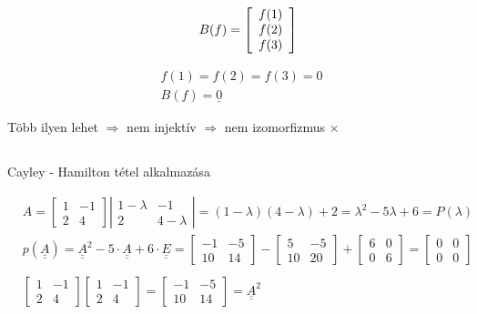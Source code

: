 $$
\begin{aligned}
&\end{aligned} \quad B(f)=\left[\begin{array}{l}
f(1) \\
f(2) \\
f(3)
\end{array}\right] \\
$$

$$
\begin{aligned}
& f(1)=f(2)=f(3)=0 \\
& B(f)=\underline{0}
\end{aligned}
$$

Több ilyen lehet $\Rightarrow$ nem injektív $\Rightarrow$ nem izomorfizmus $\times$

\subsection{}
Cayley - Hamilton tétel alkalmazása

$$
\begin{aligned}
&A=\left[\begin{array}{cc}
1 & -1 \\
2 & 4
\end{array}\right]\left|\begin{array}{cc}
1-\lambda & -1 \\
2 & 4-\lambda
\end{array}\right|=(1-\lambda)(4-\lambda)+2=\lambda^{2}-5 \lambda+6=P(\lambda) \\
&p(\underline{\underline{A}})= \underline{\underline{A}}^{2}-5 \cdot \underline{\underline{A}}+6 \cdot \underline{\underline{E}}=\left[\begin{array}{cc}
-1 & -5 \\
10 & 14
\end{array}\right]-\left[\begin{array}{cc}
5 & -5 \\
10 & 20
\end{array}\right]+\left[\begin{array}{ll}
6 & 0 \\
0 & 6
\end{array}\right]=\left[\begin{array}{ll}
0 & 0 \\
0 & 0
\end{array}\right] \\
& \\
&\left[\begin{array}{cc}
1 & -1 \\
2 & 4
\end{array}\right]\left[\begin{array}{cc}
1 & -1 \\
2 & 4 
\end{array}\right]= \left[ \begin{array}{cc}
    -1 & -5 \\
    10 & 14
\end{array}\right] =
\underline{\underline{A}}^{2}
\end{aligned}
$$

